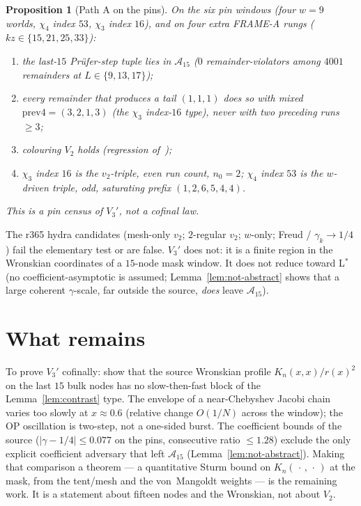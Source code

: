 \documentclass[11pt]{article}
\newtheorem{prop}{Proposition}
\theoremstyle{remark}
\begin{document}
\begin{prop}[Path A on the pins]\label{prop:pins}
On the six pin windows (four $w=9$ worlds, $\chi_4$ index $53$,
$\chi_3$ index $16$), and on four extra FRAME-A rungs
($kz\in\{15,21,25,33\}$):
\begin{enumerate}
\item the last-$15$ Pr\"ufer-step tuple lies in
  $\mathcal{A}_{15}$ ($0$ remainder-violators among $4001$
  remainders at $L\in\{9,13,17\}$);
\item every remainder that produces a tail $(1,1,1)$ does so
  with mixed $\mathrm{prev4}=(3,2,1,3)$ (the $\chi_3$
  index-$16$ type), never with two preceding runs $\ge 3$;
\item colouring $V_2$ holds (regression of~\cite{v2});
\item $\chi_3$ index $16$ is the $v_2$-triple, even run count,
  $n_0=2$; $\chi_4$ index $53$ is the $w$-driven triple,
  odd, saturating prefix $(1,2,6,5,4,4)$.
\end{enumerate}
This is a pin census of $V_3'$, not a cofinal law.
\end{prop}

The r365 hydra candidates (mesh-only $v_2$; $2$-regular
$v_2$; $w$-only; Freud / $\gamma_k\to 1/4$) fail the elementary
test or are false.  $V_3'$ does not: it is a finite region in
the Wronskian coordinates of a $15$-node mask window.  It does
not reduce toward L$^*$ (no coefficient-asymptotic is assumed;
Lemma~\ref{lem:not-abstract} shows that a large coherent
$\gamma$-scale, far outside the source, \emph{does} leave
$\mathcal{A}_{15}$).

\section{What remains}\label{sec:rest}

To prove $V_3'$ cofinally: show that the source Wronskian
profile $K_n(x,x)/r(x)^2$ on the last $15$ bulk nodes has no
slow-then-fast block of the Lemma~\ref{lem:contrast} type.
The envelope of a near-Chebyshev Jacobi chain varies too slowly
at $x\approx 0.6$ (relative change $O(1/N)$ across the window);
the OP oscillation is two-step, not a one-sided burst.  The
coefficient bounds of the source ($\lvert\gamma-1/4\rvert\le 0.077$
on the pins, consecutive ratio $\le 1.28$) exclude the only
explicit coefficient adversary that left $\mathcal{A}_{15}$
(Lemma~\ref{lem:not-abstract}).  Making that comparison a
theorem --- a quantitative Sturm bound on $K_n(\,\cdot\,,\,\cdot\,)$
at the mask, from the tent/mesh and the von~Mangoldt weights
--- is the remaining work.  It is a statement about fifteen
nodes and the Wronskian, not about $V_2$.
\end{document}

